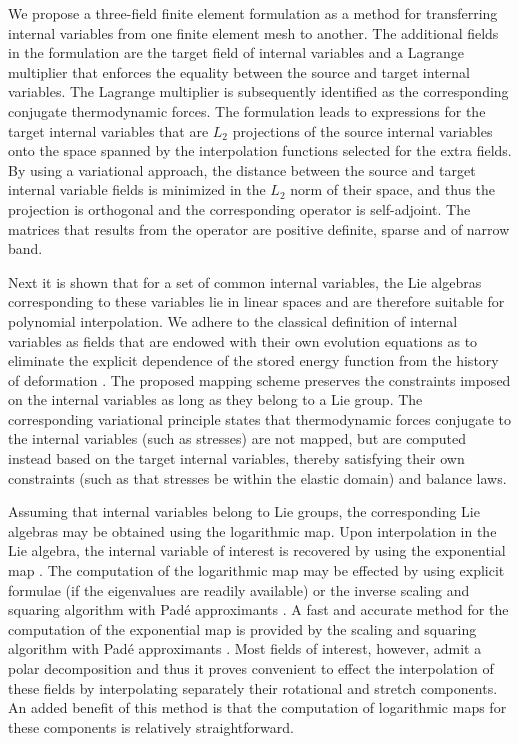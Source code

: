 \documentclass[12pt]{article}
\begin{document}
We propose a three-field finite element formulation as a method for transferring
internal variables from one finite element mesh to another. The additional
fields in the formulation are the target field of internal variables and a
Lagrange multiplier that enforces the equality between the source and target
internal variables. The Lagrange multiplier is subsequently identified as the
corresponding conjugate thermodynamic forces. The formulation leads to
expressions for the target internal variables that are $L_2$ projections of the
source internal variables onto the space spanned by the interpolation functions
selected for the extra fields. By using a variational approach, the distance
between the source and target internal variable fields is minimized in the $L_2$
norm of their space, and thus the projection is orthogonal and the corresponding
operator is self-adjoint. The matrices that results from the operator are
positive definite, sparse and of narrow band.

Next it is shown that for a set of common internal variables, the Lie algebras
corresponding to these variables lie in linear spaces and are therefore suitable
for polynomial interpolation.  We adhere to the classical definition of internal
variables as fields that are endowed with their own evolution equations as to
eliminate the explicit dependence of the stored energy function from the history
of deformation \citep{Muschik:2001, Antman:2005}. The proposed mapping scheme
preserves the constraints imposed on the internal variables as long as they
belong to a Lie group. The corresponding variational principle states that
thermodynamic forces conjugate to the internal variables (such as stresses) are
not mapped, but are computed instead based on the target internal variables,
thereby satisfying their own constraints (such as that stresses be within the
elastic domain) and balance laws.

Assuming that internal variables belong to Lie groups, the corresponding Lie
algebras may be obtained using the logarithmic map. Upon interpolation in the
Lie algebra, the internal variable of interest is recovered by using the
exponential map \citep{Marsden.Ratiu:1999, Sepanski:2007,
Kosmann-Schwarzbach:2009,
  Gallier:2011}. The computation of the logarithmic map may be
effected by using explicit formulae (if the eigenvalues are readily available)
\citep{Jog:2008} or the inverse scaling and squaring algorithm with Pad\'e
approximants \citep{Cheng.etal:2001,
  Davies.Higham:2003}.  A fast and accurate method for the computation
of the exponential map is provided by the scaling and squaring algorithm with
Pad\'e approximants \citep{Higham:2001,Higham:2005}. Most fields of interest,
however, admit a polar decomposition and thus it proves convenient to effect the
interpolation of these fields by interpolating separately their rotational and
stretch components. An added benefit of this method is that the computation of
logarithmic maps for these components is relatively straightforward.
\end{document}
